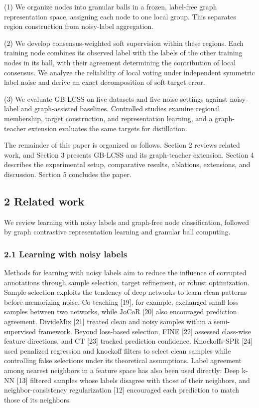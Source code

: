(1) We organize nodes into granular balls in a frozen, label-free graph representation space, assigning each node to one local group. This separates region construction from noisy-label aggregation.

(2) We develop consensus-weighted soft supervision within these regions. Each training node combines its observed label with the labels of the other training nodes in its ball, with their agreement determining the contribution of local consensus. We analyze the reliability of local voting under independent symmetric label noise and derive an exact decomposition of soft-target error.

(3) We evaluate GB-LCSS on five datasets and five noise settings against noisy-label and graph-assisted baselines. Controlled studies examine regional membership, target construction, and representation learning, and a graph-teacher extension evaluates the same targets for distillation.

The remainder of this paper is organized as follows. Section 2 reviews related work, and Section 3 presents GB-LCSS and its graph-teacher extension. Section 4 describes the experimental setup, comparative results, ablations, extensions, and discussion. Section 5 concludes the paper.

\subsection{2 Related work}\label{related-work}

We review learning with noisy labels and graph-free node classification, followed by graph contrastive representation learning and granular ball computing.

\subsubsection{2.1 Learning with noisy labels}\label{learning-with-noisy-labels}

Methods for learning with noisy labels aim to reduce the influence of corrupted annotations through sample selection, target refinement, or robust optimization. Sample selection exploits the tendency of deep networks to learn clean patterns before memorizing noise. Co-teaching {[}19{]}, for example, exchanged small-loss samples between two networks, while JoCoR {[}20{]} also encouraged prediction agreement. DivideMix {[}21{]} treated clean and noisy samples within a semi-supervised framework. Beyond loss-based selection, FINE {[}22{]} assessed class-wise feature directions, and CT {[}23{]} tracked prediction confidence. Knockoffs-SPR {[}24{]} used penalized regression and knockoff filters to select clean samples while controlling false selections under its theoretical assumptions. Label agreement among nearest neighbors in a feature space has also been used directly: Deep k-NN {[}13{]} filtered samples whose labels disagree with those of their neighbors, and neighbor-consistency regularization {[}12{]} encouraged each prediction to match those of its neighbors.

